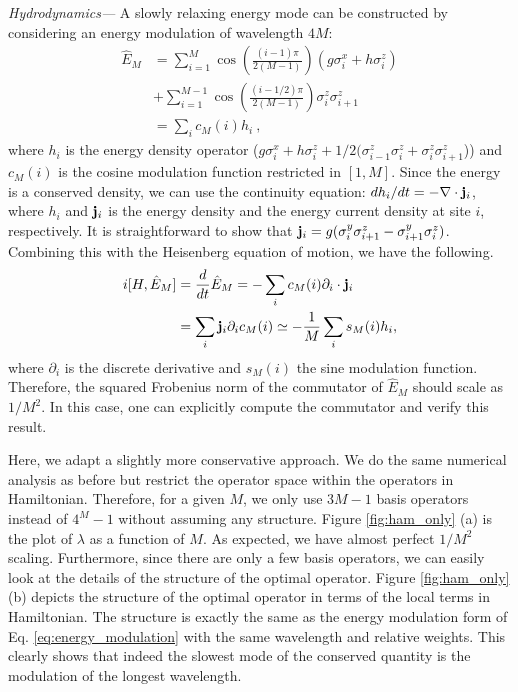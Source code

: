 \documentclass[twocolumn,superscriptaddress, prb]{revtex4-1}
\begin{document}
{\it Hydrodynamics---}
A slowly relaxing energy mode can be constructed by considering an energy modulation of wavelength $4M$:
\begin{align}
\hat{E}_M &= \sum_{i=1}^{M} \cos\left(\frac{(i-1)\pi}{2(M-1)}\right)(g \sigma^x_i + h\sigma^z_i)\nonumber\\
&+ \sum_{i=1}^{M-1} \cos\left(\frac{(i-1/2)\pi}{2(M-1)}\right)\sigma^z_i\sigma^z_{i+1}\\
&= \sum_i c_M(i) h_i ~, 
\label{eq:energy_modulation}
\end{align}
where $h_i$ is the energy density operator ($g \sigma^x_i + h\sigma^z_i + 1/2(\sigma^z_{i-1}\sigma^z_i + \sigma^z_i\sigma^z_{i+1}$))
and $c_M(i)$ is the cosine modulation function restricted in $[1,M]$. 
Since the energy is a conserved density, we can use the continuity equation: 
$d h_i/dt = -\nabla \cdot {\bf j}_i$, where $h_i$ and ${\bf j}_i$ is the energy density and the energy current density at site $i$, respectively.
It is straightforward to show that ${\bf j}_i = g(\sigma^y_i \sigma^z_{i+1} - \sigma^y_{i+1} \sigma^z_i)$. 
Combining this with the Heisenberg equation of motion, we have the following.  
\begin{align}
 i[H,\hat{E}_M] &= \frac{d}{dt} \hat{E}_M = -\sum_i c_M(i) \partial_i \cdot {\bf j}_i \\
 &= \sum_i {\bf j}_i \partial_i c_M(i) \simeq -\frac{1}{M} \sum_i s_M(i) h_i,  
\end{align}
where $\partial_i$ is the discrete derivative and $s_M(i)$ the sine modulation function.  
Therefore, the squared Frobenius norm of the commutator of $\hat{E}_M$ should scale as $1/M^2$.  In this case, one can explicitly compute the commutator and verify this result.

Here, we adapt a slightly more conservative approach.
We do the same numerical analysis as before but restrict the operator space within the operators in Hamiltonian.
Therefore, for a given $M$, we only use $3M - 1$ basis operators instead of $4^M-1$ without assuming any structure.
Figure \ref{fig:ham_only} (a) is the plot of $\lambda$ as a function of $M$.
As expected, we have almost perfect $1/M^2$ scaling.
Furthermore, since there are only a few basis operators, we can easily look at the details of the structure of the optimal operator.
Figure \ref{fig:ham_only} (b) depicts the structure of the optimal operator in terms of the local terms in Hamiltonian.
The structure is exactly the same as the energy modulation form of Eq. \eqref{eq:energy_modulation} with the same wavelength and relative weights.
This clearly shows that indeed the slowest mode of the conserved quantity is the modulation of the longest wavelength.
\end{document}

